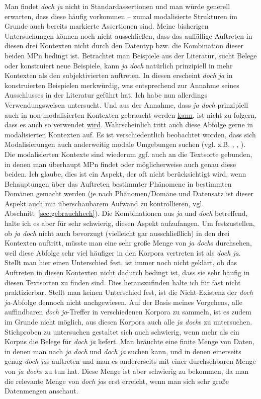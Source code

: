 Man findet \textit{doch ja} nicht in Standardassertionen und man würde generell erwarten, dass diese häufig vorkommen – zumal modalisierte Strukturen im Grunde auch bereits markierte Assertionen sind. Meine bisherigen Untersuchungen können noch nicht ausschließen, dass das auffällige Auftreten in diesen drei Kontexten nicht durch den Datentyp bzw. die Kombination dieser beiden MPn bedingt ist. Betrachtet man Beispiele aus der Literatur, sucht Belege oder konstruiert neue Beispiele, kann \textit{ja doch} natürlich prinzipiell in mehr Kontexten als den subjektivierten auftreten. In diesen erscheint \textit{doch ja} in konstruierten Beispielen merkwürdig, was entsprechend zur Annahme seines Ausschlusses in der Lite\-ratur geführt hat. Ich habe nun allerdings Verwendungsweisen untersucht. Und aus der Annahme, dass \textit{ja doch} prinzipiell auch in non-modalisierten Kontexten gebraucht werden \underline{kann}, ist nicht zu folgern, dass es auch so verwendet \underline{wird}. Wahrscheinlich tritt auch diese Abfolge gerne in modalisierten Kontexten auf. Es ist verschiedentlich beobachtet worden, dass sich Modalisierungen auch anderweitig modale Umgebungen suchen (vgl. z.B. \citealt[26]{Albrecht1977}, \citealt[26]{Aijmer1997}, \citealt[278-279]{Bluehdorn2006}). Die modalisierten Kontexte sind wiederum ggf. auch an die Textsorte gebunden, in denen man überhaupt MPn findet oder möglicherweise auch genau diese beiden. Ich glaube, dies ist ein Aspekt, der oft nicht berücksichtigt wird, wenn Behauptungen über das Auftreten bestimmter Phänomene in bestimmten Domänen gemacht werden (je nach Phänomen/Domä\-ne und Datensatz ist dieser Aspekt auch mit überschaubarem Aufwand zu kontrollieren, vgl. Abschnitt~\ref{sec:gebrauchheeh}). Die Kombinationen aus \textit{ja} und \textit{doch} betreffend, halte ich es aber für sehr schwierig, diesen Aspekt aufzufangen. Um festzustellen, ob \textit{ja doch} nicht auch bevorzugt (vielleicht gar ausschließlich) in den drei Kontexten auftritt, müsste man eine sehr große Menge von \textit{ja doch}s durchsehen, weil diese Abfolge sehr viel häufiger in den Korpora vertreten ist als \textit{doch ja}. Stellt man hier einen Unterschied fest, ist immer noch nicht geklärt, ob das Auftreten in diesen Kontexten nicht dadurch bedingt ist, dass sie sehr häufig in diesen Textsorten zu finden sind. Dies herauszufinden halte ich für fast nicht praktizierbar. Stellt man keinen Unterschied fest, ist die Nicht-Existenz der \textit{doch ja}-Abfolge dennoch nicht nachgewiesen. Auf der Basis meines Vorgehens, alle auffindbaren \textit{doch ja}-Treffer in verschiedenen Korpora zu sammeln, ist es zudem im Grunde nicht möglich, aus diesen Korpora auch alle \textit{ja doch}s zu untersuchen. Stichproben zu untersuchen gestaltet sich auch schwierig, wenn mehr als ein Korpus die Belege für \textit{doch ja} liefert. Man bräuchte eine finite Menge von Daten, in denen man nach \textit{ja doch} und \textit{doch ja} suchen kann, und in denen ei\-nerseits genug \textit{doch ja}s auftreten und man es andererseits mit einer durchsehbaren Menge von \textit{ja doch}s zu tun hat. Diese Menge ist aber schwierig zu bekommen, da man die relevante Menge von \textit{doch ja}s erst erreicht, wenn man sich sehr große Datenmengen anschaut.

